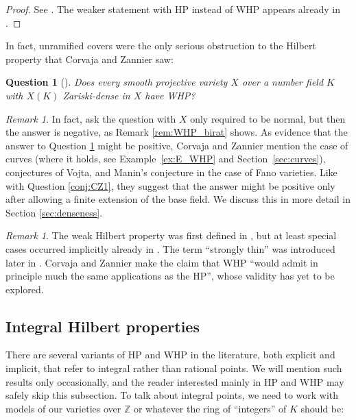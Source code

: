 \documentclass[10pt,a4paper]{amsart}
\theoremstyle{plain}
\newtheorem{question}[theorem]{Question}
\theoremstyle{remark}
\newtheorem{remark}[theorem]{Remark}
\numberwithin{theorem}{section}
\begin{document}
\begin{proof}
See \cite[Proposition 5.5]{BFP24}.
The weaker statement with HP instead of WHP 
appears already in \cite[p.~20, Exercise 1]{Serre}.
\end{proof}

In fact, unramified covers were the only serious obstruction to the Hilbert property that Corvaja and Zannier saw: 

\begin{question}[{\cite[Question-Conjecture 2]{CZ}}]\label{conj:CZ2}
Does every smooth projective variety $X$ over a number field $K$
with  $X(K)$ Zariski-dense in $X$
have WHP?
\end{question}

\begin{remark}\label{rem:CZ2}
In fact, \cite{CZ} ask the question with $X$ only required to be normal, but then the answer is negative,
as Remark \ref{rem:WHP_birat} shows.
As evidence that the answer to Question \ref{conj:CZ2} might be positive, Corvaja and Zannier mention the case of curves
(where it holds, see Example~\ref{ex:E_WHP} and Section~\ref{sec:curves}),
conjectures of Vojta, and Manin's conjecture in the case of Fano varieties.
Like with Question \ref{conj:CZ1}, they suggest that the answer might be positive only after allowing a finite extension of the base field.
We discuss this in more detail in Section \ref{sec:denseness}.
\end{remark}

\begin{remark}
The weak Hilbert property was first defined in \cite{CZ}, 
but at least special cases  occurred implicitly already in 
\cite{FZ,CorvajaAlgebraicGroups,Zannier}. 
The term ``strongly thin'' was introduced later in \cite{BFP24,Luger2}.
Corvaja and Zannier \cite[p.~582]{CZ} make the claim that WHP
``would admit in principle much the same applications as the HP'',
whose validity has yet to be explored. 
\end{remark}

\subsection{Integral Hilbert properties}
\label{sec:integral}
There are several variants of HP and WHP in the literature, both explicit and implicit, that refer to integral rather than rational points.
We will mention such results only occasionally,
and the reader interested mainly in HP and WHP may safely skip this subsection.
To talk about integral points, we need to work with models of our varieties over $\mathbb{Z}$ or whatever the ring of ``integers'' of $K$ should be:
\end{document}
